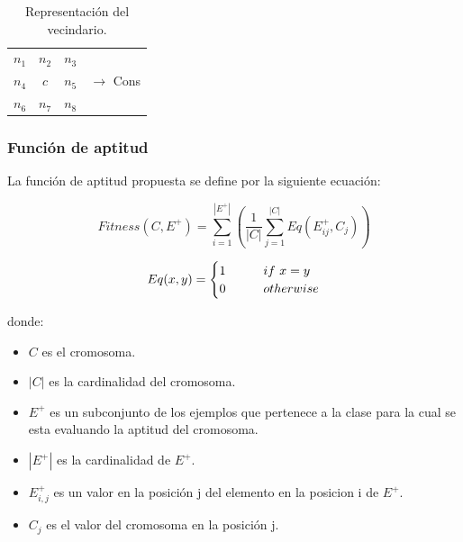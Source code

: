 \begin{table}[H]
	\begin{center}
		\begin{tabular}{ c c c c}
			$n_1$&$n_2$&$n_3$&\\
			$n_4$&$c$&$n_5$& $\rightarrow$ Cons\\
			$n_6$&$n_7$&$n_8$&\\
		\end{tabular}
	\end{center}
	\caption{\label{tab:bylneigh} Representación del vecindario.}
\end{table}

\begin{table}[H]
	\begin{center}
	\end{center}
	\caption{\label{tab:bylneigh} Representación del la codificación.}
\end{table}

\subsubsection{Función de aptitud}

La función de aptitud propuesta se define por la siguiente ecuación:

\[Fitness(C,E^{+})=\sum_{i=1}^{|E^{+}|} \left(\frac{1}{|C|}\sum_{j=1}^{|C|} Eq(E^{+}_{ij},C_{j}) \right)\]

\[
Eq(x,y)=
\begin{cases}
\text1 &\qquad if\ x=y \\
\text0 &\qquad otherwise
\end{cases}
\]

donde:
\begin{itemize}
	\item \(C\) es el cromosoma.
	\item \(|C|\) es la cardinalidad del cromosoma.
	\item \(E^{+}\) es un subconjunto de los ejemplos que pertenece a la clase para la cual se esta evaluando la aptitud del cromosoma.
	\item \(|E^{+}|\) es la cardinalidad de $E^+$.
	\item \(E^{+}_{i,j}\) es un valor en la posición j del elemento en la posicion i de $E^+$.
	\item \(C_{j}\) es el valor del cromosoma en la posición j.
\end{itemize}

